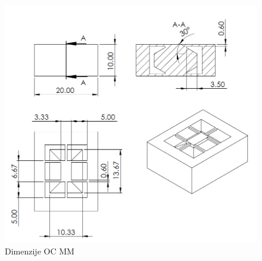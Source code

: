 \documentclass[12pt]{report}
\begin{document}
\begin{figure}[H]
  \centering
  \includegraphics[scale=0.8]{Images/drawing.png}
  \caption{Dimenzije \ac{OC} \ac{MM}}
\end{figure}

\printbibliography[title={Viri}]
\end{document}
